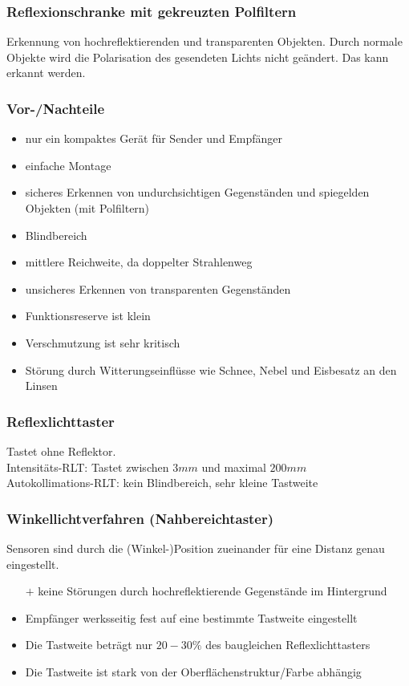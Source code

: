 \documentclass{scrreprt}
\begin{document}
\subsubsection*{Reflexionschranke mit gekreuzten Polfiltern}
Erkennung von hochreflektierenden und transparenten Objekten. Durch normale Objekte wird die Polarisation des gesendeten Lichts nicht geändert. Das kann erkannt werden.

\subsubsection*{Vor-/Nachteile}
\begin{itemize}[label=$+$]
\item nur ein kompaktes Gerät für Sender und Empfänger
\item einfache Montage
\item sicheres Erkennen von undurchsichtigen Gegenständen und spiegelden Objekten (mit Polfiltern)
\end{itemize}
\begin{itemize}[label=$-$]
\item Blindbereich
\item mittlere Reichweite, da doppelter Strahlenweg
\item unsicheres Erkennen von transparenten Gegenständen
\item Funktionsreserve ist klein
\item Verschmutzung ist sehr kritisch
\item Störung durch Witterungseinflüsse wie Schnee, Nebel und Eisbesatz an den Linsen
\end{itemize}

\subsubsection{Reflexlichttaster}
Tastet ohne Reflektor.\\
Intensitäts-RLT: Tastet zwischen $3\unit{mm}$ und maximal $200 \unit{mm}$\\
Autokollimations-RLT: kein Blindbereich, sehr kleine Tastweite

\subsubsection*{Winkellichtverfahren (Nahbereichtaster)}
Sensoren sind durch die (Winkel-)Position zueinander für eine Distanz genau eingestellt.
\begin{itemize}[label=$-$]
\item[$+$] keine Störungen durch hochreflektierende Gegenstände im Hintergrund
\item Empfänger werksseitig fest auf eine bestimmte Tastweite eingestellt
\item Die Tastweite beträgt nur $20-30\%$ des baugleichen Reflexlichttasters
\item Die Tastweite ist stark von der Oberflächenstruktur/Farbe abhängig
\end{itemize}
\end{document}
